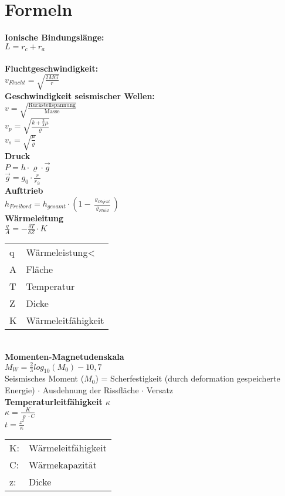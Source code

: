 \documentclass[a4,12pt]{scrartcl}
\begin{document}
\section{Formeln} \label{Formeln}

\textbf{Ionische Bindungslänge:}\\
$L=r_c + r_a$\\
\\
\textbf{Fluchtgeschwindigkeit:}\\
$v_{Flucht} = \sqrt{\frac{2MG}{r}}$
\\
\textbf{Geschwindigkeit seismischer Wellen:}\\
$v = \sqrt{\frac{\text{Rückstellspannung}}{\text{Masse}}}$\\
$v_p = \sqrt{\frac{k + \frac{3}{4} \mu}{\varrho}}$\\
$v_s = \sqrt{\frac{\mu}{\varrho}}$\\
\textbf{Druck}\\
$P = h \cdot \varrho \cdot \overrightarrow{g}$\\
$\overrightarrow{g} = g_0 \cdot \frac{r}{r_\odot}$\\
\textbf{Aufttrieb}\\
$h_{Freibord} = h_{gesamt} \cdot (1 - \frac{\varrho_{Objekt}}{\varrho_{Fluid}})$\\
\textbf{Wärmeleitung}\\
$\frac{q}{A} = - \frac{\delta T}{\delta Z} \cdot K$\\
\begin{tabular}{ll}
q & 	Wärmeleistung<\\
A & Fläche\\
T & Temperatur\\
Z & Dicke\\
K & Wärmeleitfähigkeit\\
\end{tabular}\\
\textbf{Momenten-Magnetudenskala}\\
$M_W = \frac{2}{3} log_{10}(M_0)-10,7$\\

Seismisches Moment ($M_0$) = Scherfestigkeit (durch deformation gespeicherte Energie) $\cdot$ Ausdehnung der Rissfläche $\cdot$ Versatz \\
\textbf{Temperaturleitfähigkeit $\kappa$}\\
$\kappa = \frac{K}{\varrho \cdot C}$\\
$t = \frac{z^2}{\kappa}$\\
\begin{tabular}{ll}
K: & Wärmeleitfähigkeit\\
C: & Wärmekapazität\\
z: & Dicke
\end{tabular}
\end{document}
